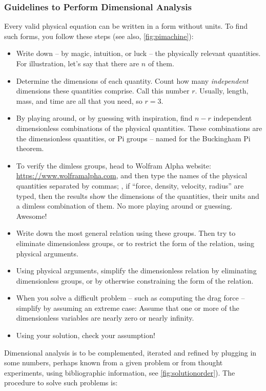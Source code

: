 \subsubsection{Guidelines to Perform Dimensional Analysis}
Every valid physical equation can be written in a form without units. To find such forms, you follow these steps (see also, \cref{fig:pimachine}):
\begin{itemize}
\item Write down -- by magic, intuition, or luck -- the physically relevant quantities. For illustration, let's say that there are $n$ of them.
%
\item Determine the dimensions of each quantity. Count how many \emph{independent} dimensions these quantities comprise. Call this number $r$. Usually, length, mass, and time are all that you need, so $r = 3$.
%
\item By playing around, or by guessing with inspiration, find $n - r$ independent dimensionless combinations of the physical quantities. These combinations are the dimensionless quantities, or Pi groups -- named for the Buckingham Pi theorem.
%
\item To verify the dimless groups, head to Wolfram Alpha website: \url{https://www.wolframalpha.com}, and then type the names of the physical quantities separated by commas; \ie, if ``force, density, velocity, radius'' are typed, then the results show the dimensions of the quantities, their units and a dimless combination of them. No more playing around or guessing. Awesome!
%
\item Write down the most general relation using these groups. Then try to eliminate dimensionless groups, or to restrict the form of the relation, using physical arguments.
%
\item Using physical arguments, simplify the dimensionless relation by eliminating dimensionless groups, or by otherwise constraining the form of the relation.
%
\item When you solve a difficult problem -- such as computing the drag force -- simplify by assuming an extreme case: Assume that one or more of the dimensionless variables are nearly zero or nearly infinity.
%
\item Using your solution, check your assumption!
%
\end{itemize}
%
Dimensional analysis is to be complemented, iterated and refined by plugging in some numbers, perhaps known from a given problem or from thought experiments, using bibliographic information, see \cref{fig:solutionorder}). The procedure to solve such problems is:
